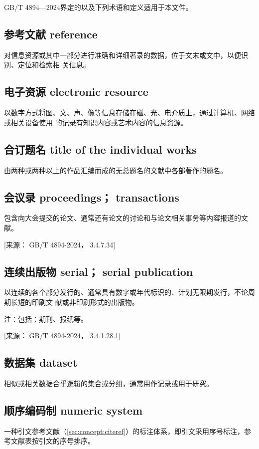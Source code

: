\documentclass[twoside]{article}%
\begin{document}
{
\renewcommand\addcontentsline[3]{}
GB/T 4894—2024界定的以及下列术语和定义适用于本文件。

\subsection{参考文献 reference}
对信息资源或其中一部分进行准确和详细著录的数据，位于文末或文中，以便识别、定位和检索相
关信息。

\subsection{电子资源 electronic resource}
以数字方式将图、文、声、像等信息存储在磁、光、电介质上，通过计算机、网络或相关设备使用
的记录有知识内容或艺术内容的信息资源。

\subsection{合订题名 title of the individual works}
由两种或两种以上的作品汇编而成的无总题名的文献中各部著作的题名。

\subsection{会议录 proceedings； transactions}
包含向大会提交的论文、通常还有论文的讨论和与论文相关事务等内容报道的文献。

[来源： GB/T 4894-2024， 3.4.7.34]

\subsection{连续出版物 serial； serial publication}\label{sec:concept:serial}
以连续的各个部分发行的、通常具有数字或年代标识的、计划无限期发行，不论周期长短的印刷文
献或非印刷形式的出版物。

注：包括：期刊、报纸等。

[来源： GB/T 4894-2024， 3.4.1.28.1]

\subsection{数据集 dataset}
相似或相关数据合乎逻辑的集合或分组，通常用作记录或用于研究。

\subsection{顺序编码制 numeric system}
一种引文参考文献（\ref{sec:concept:citeref}）的标注体系，即引文采用序号标注，参考文献表按引文的序号排序。

}
\end{document}
